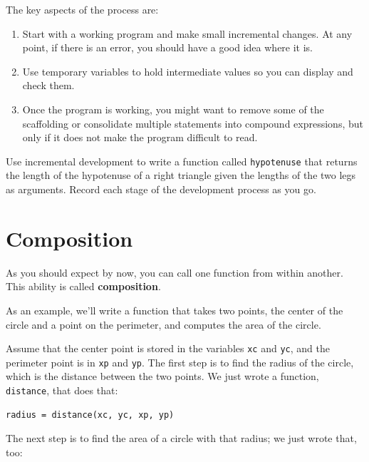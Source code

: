 \documentclass[10pt]{book}
\begin{document}
The key aspects of the process are:

\begin{enumerate}

\item Start with a working program and make small incremental changes. 
At any point, if there is an error, you should have a good idea
where it is.

\item Use temporary variables to hold intermediate values so you can
display and check them.

\item Once the program is working, you might want to remove some of
the scaffolding or consolidate multiple statements into compound
expressions, but only if it does not make the program difficult to
read.

\end{enumerate}

\begin{ex}


Use incremental development to write a function
called {\tt hypotenuse} that returns the length of the hypotenuse of a
right triangle given the lengths of the two legs as arguments.
Record each stage of the development process as you go.
\end{ex}


\section{Composition}


As you should expect by now, you can call one function from
within another.  This ability is called {\bf composition}.

As an example, we'll write a function that takes two points,
the center of the circle and a point on the perimeter, and computes
the area of the circle.

Assume that the center point is stored in the variables {\tt xc} and
{\tt yc}, and the perimeter point is in {\tt xp} and {\tt yp}. The
first step is to find the radius of the circle, which is the distance
between the two points.  We just wrote a function, {\tt
distance}, that does that:

\beforeverb
\begin{verbatim}
radius = distance(xc, yc, xp, yp)
\end{verbatim}
\afterverb
%
The next step is to find the area of a circle with that radius;
we just wrote that, too:
\end{document}
